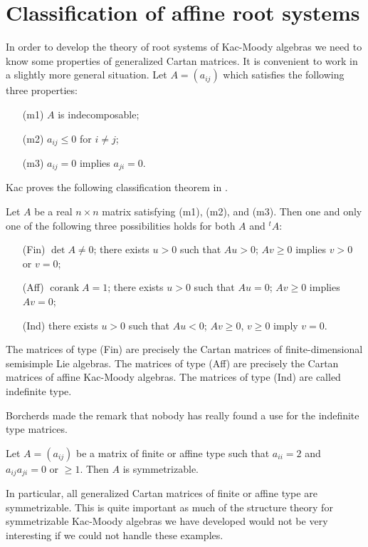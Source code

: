 \documentclass[12pt]{article}
\begin{document}
\section{Classification of affine root systems}
In order to develop the theory of root systems of Kac-Moody algebras we need to know some properties of generalized Cartan matrices. It is convenient to work in a slightly more general situation. Let $A = (a_{ij})$ which satisfies the following three properties:
\begin{itemize}
    \item[(m1)] $A$ is indecomposable;
    \item[(m2)] $a_{ij} \leq 0$ for $i \neq j$;
    \item[(m3)] $a_{ij} = 0$ implies $a_{ji} = 0$.
\end{itemize}
Kac proves the following classification theorem in \cite{kac}.
\begin{theorem}
    Let $A$ be a real $n \times n$ matrix satisfying (m1), (m2), and (m3). Then one and only one of the following three possibilities holds for both $A$ and ${}^t A$:
    \begin{itemize}
        \item[(Fin)] $\det A \neq 0$; there exists $u > 0$ such that $Au > 0$; $Av \geq 0$ implies $v > 0$ or $v = 0$;
        \item[(Aff)] $\operatorname{corank} A = 1$; there exists $u > 0$ such that $Au = 0$; $Av \geq 0$ implies $Av = 0$;
        \item[(Ind)] there exists $u > 0$ such that $Au < 0$; $Av \geq 0$, $v \geq 0$ imply $v = 0$.
    \end{itemize}
\end{theorem}

\begin{remark}
    The matrices of type (Fin) are precisely the Cartan matrices of finite-dimensional semisimple Lie algebras. The matrices of type (Aff) are precisely the Cartan matrices of affine Kac-Moody algebras. The matrices of type (Ind) are called indefinite type.

    Borcherds made the remark that nobody has really found a use for the indefinite type matrices.
\end{remark}

\begin{lemma}
     Let $A = (a_{ij})$ be a matrix of finite or affine type such
    that $a_{ii} = 2$ and $a_{ij}a_{ji} = 0$ or $\geq 1$. Then $A$ is symmetrizable.
\end{lemma}
In particular, all generalized Cartan matrices of finite or affine type are symmetrizable. This is quite important as much of the structure theory for symmetrizable Kac-Moody algebras we have developed would not be very interesting if we could not handle these examples.
\end{document}
